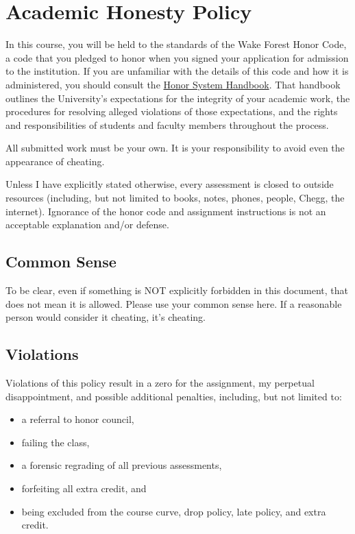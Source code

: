 \hypertarget{academic-honesty-policy}{%
\chapter{Academic Honesty Policy}\label{academic-honesty-policy}}

In this course, you will be held to the standards of the Wake Forest Honor Code, a code that you pledged to honor when you signed your application for admission to the institution.
If you are unfamiliar with the details of this code and how it is administered, you should consult the \href{https://studentconduct.wfu.edu/honor-system-wfu/}{Honor System Handbook}.
That handbook outlines the University's expectations for the integrity of your academic work, the procedures for resolving alleged violations of those expectations, and the rights and responsibilities of students and faculty members throughout the process.

All submitted work must be your own. It is your responsibility to avoid even the appearance of cheating.

Unless I have explicitly stated otherwise, every assessment is closed to outside resources (including, but not limited to books, notes, phones, people, Chegg, the internet).
Ignorance of the honor code and assignment instructions is not an acceptable explanation and/or defense.

\hypertarget{common-sense}{%
\section{Common Sense}\label{common-sense}}

To be clear, even if something is NOT explicitly forbidden in this document, that does not mean it is allowed. Please use your common sense here. If a reasonable person would consider it cheating, it's cheating.

\hypertarget{violations}{%
\section{Violations}\label{violations}}

Violations of this policy result in a zero for the assignment, my perpetual disappointment, and possible additional penalties, including, but not limited to:

\begin{itemize}
\tightlist
\item
  a referral to honor council,
\item
  failing the class,
\item
  a forensic regrading of all previous assessments,
\item
  forfeiting all extra credit, and
\item
  being excluded from the course curve, drop policy, late policy, and extra credit.
\end{itemize}

